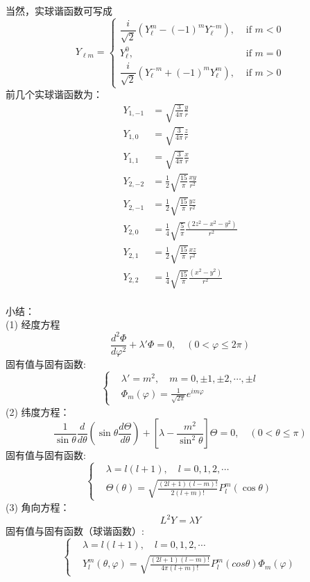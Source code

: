 	当然，实球谐函数可写成
	$$
	Y_{\ell m}= \begin{cases}\dfrac{i}{\sqrt{2}}\left(Y_{\ell}^m-(-1)^m Y_{\ell}^{-m}\right), & \text { if } m<0 \\ Y_{\ell}^0, & \text { if } m=0 \\ \dfrac{i}{\sqrt{2}}\left(Y_{\ell}^{-m}+(-1)^m Y_{\ell}^m\right), & \text { if } m>0\end{cases}
	$$
	前几个实球谐函数为：
	$$
	\begin{aligned}
	Y_{1,-1} & =\sqrt{\frac{3}{4 \pi}} \frac{y}{r} \\
	Y_{1,0} & =\sqrt{\frac{3}{4 \pi}} \frac{z}{r} \\
	Y_{1,1} & =\sqrt{\frac{3}{4 \pi}} \frac{x}{r} \\
	Y_{2,-2} & =\frac{1}{2} \sqrt{\frac{15}{\pi}} \frac{x y}{r^2} \\
	Y_{2,-1} & =\frac{1}{2} \sqrt{\frac{15}{\pi}} \frac{y z}{r^2} \\
	Y_{2,0} & =\frac{1}{4} \sqrt{\frac{5}{\pi}} \frac{\left(2 z^2-x^2-y^2\right)}{r^2} \\
	Y_{2,1} & =\frac{1}{2} \sqrt{\frac{15}{\pi}} \frac{x z}{r^2} \\
	Y_{2,2} & =\frac{1}{4} \sqrt{\frac{15}{\pi}} \frac{\left(x^2-y^2\right)}{r^2}
	\end{aligned}
	$$
	~~\\ 
	小结：\\
	(1) 经度方程 
	\begin{equation*}
		\frac{d^{2} \Phi}{d \varphi^{2}}+\lambda' \Phi=0,\quad (0<\varphi\le2 \pi)
	\end{equation*}
	固有值与固有函数:
	   $$ \left\{
	   \begin{aligned}
		&\lambda' = m^2,\quad m = 0, \pm 1, \pm 2, \cdots , \pm l \\
		&\Phi_m (\varphi)=\frac{1}{\sqrt{2\pi}} e^{im\varphi}  
	   \end{aligned} \right. $$ 
	(2) 纬度方程：
	\begin{equation*}
		\frac{1}{\sin \theta} \frac{d}{d \theta}\left(\sin \theta \frac{d \Theta}{d \theta}\right)+\left[\lambda-\frac{m^{2}}{\sin ^{2} \theta}\right] \Theta=0, \quad (0< \theta \le \pi)
	\end{equation*}	
	固有值与固有函数: 
	   $$ \left\{
	   \begin{aligned}
		&\lambda = l (l+1), \quad l =0,1,2,\cdots \\
		&\Theta (\theta) = \sqrt{\frac{(2l+1)(l-m)!}{2 (l+m)!}}  P^m _{l}(\cos\theta)
	   \end{aligned} \right. $$ 
	(3) 角向方程：
	\begin{equation*}
		L^2 Y=\lambda Y
	\end{equation*}	
	固有值与固有函数（球谐函数）: 
	$$ \left\{
		\begin{aligned}
		 &\lambda = l (l+1), \quad l =0,1,2,\cdots \\
		 &Y_{l}^m (\theta,\varphi)= \sqrt{\frac{(2l+1)(l-m)!}{4\pi (l+m)!}}  P_l ^m (cos \theta)  \Phi_m (\varphi)
		\end{aligned} \right. $$ 
	

